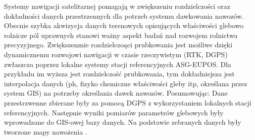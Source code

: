 \indent Systemy nawigacji satelitarnej pomagają w zwiększeniu rozdzielczości oraz dokładności danych przestrzennych
dla potrzeb systemu dawkowania nawozów. Obecnie szybka akwizycja danych terenowych opisujących właściwości glebowo rolnicze pól uprawnych
stanowi ważny aspekt badań nad rozwojem rolnictwa precyzyjnego. Zwiększenmie rozdzielczoąci prubkowania jest możliwe dzięki
dynamicznemu rozwojowi nawigacji w czasie rzeczywistym (RTK, DGPS) zwłaszcza poprzez lokalne systemy stacji referencyjnych ASG-EUPOS.
Dla przykładu im wyższa jest rozdzielczość prubkowania, tym dokładniejsza jest interpolacja danych 
(ph, fizyko chemiczne właściwości gleby itp, określana przez system GIS) na potrzeby określania dawek nawozów.
Posumowując: Dane przestrzwenne zbierane były za pomocą DGPS z wykorzystaniem lokalnych stacji referencyjnych.
Następnie wyniki pomiarów parametrów glebowych były wprowadzane do GIS-owej bazy danych.
Na podstawie zebranych danych były tworzone mapy nawożenia \cite{CCTA5_268_278}.


